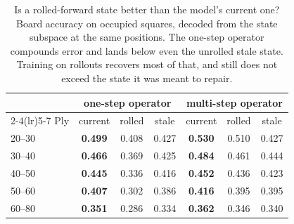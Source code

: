 \begin{table}[t]
\centering\small
\caption{Is a rolled-forward state better than the model's current
one? Board accuracy on occupied squares, decoded from the state
subspace at the same positions. The one-step operator compounds error
and lands below even the unrolled stale state. Training on rollouts
recovers most of that, and still does not exceed the state it was
meant to repair.}
\label{tab:rollout}
\begin{tabular}{lcccccc}
\toprule
& \multicolumn{3}{c}{one-step operator} & \multicolumn{3}{c}{multi-step operator} \\
\cmidrule(lr){2-4}\cmidrule(lr){5-7}
Ply & current & rolled & stale & current & rolled & stale \\
\midrule
20--30 & \textbf{0.499} & 0.408 & 0.427 & \textbf{0.530} & 0.510 & 0.427 \\
30--40 & \textbf{0.466} & 0.369 & 0.425 & \textbf{0.484} & 0.461 & 0.444 \\
40--50 & \textbf{0.445} & 0.336 & 0.416 & \textbf{0.452} & 0.436 & 0.423 \\
50--60 & \textbf{0.407} & 0.302 & 0.386 & \textbf{0.416} & 0.395 & 0.395 \\
60--80 & \textbf{0.351} & 0.286 & 0.334 & \textbf{0.362} & 0.346 & 0.340 \\
\bottomrule
\end{tabular}
\end{table}
